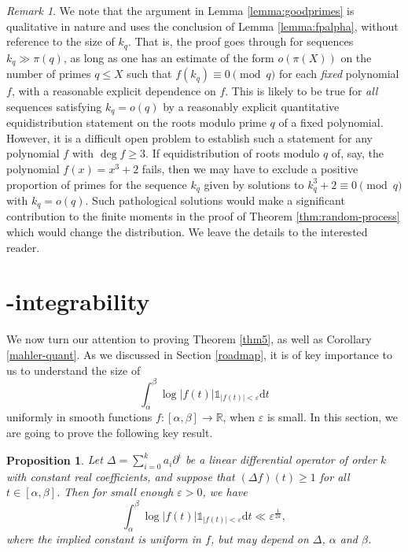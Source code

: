 \documentclass[12pt, a4paper]{amsart}
\newtheorem{proposition}{Proposition}
\theoremstyle{remark}
\newtheorem*{remark}{Remark}
\newcommand{\ud}{\mathrm{d}}
\begin{document}
\begin{remark}
     We note that the argument in Lemma \ref{lemma:goodprimes} is  qualitative in nature and uses the conclusion of Lemma \ref{lemma:fpalpha}, without reference to the size of $k_q$. That is, the proof goes through for sequences $k_q\gg \pi(q)$, as long as one has an estimate of the form $o(\pi(X))$ on the number of primes $q\leq X$ such that $f(k_q)\equiv 0\pmod q$ for each \emph{fixed} polynomial $f$, with a reasonable explicit dependence on $f$. This is likely to be true for \emph{all} sequences satisfying $k_q = o(q)$ by a reasonably explicit quantitative equidistribution statement on the roots modulo prime $q$ of a fixed polynomial. However, it is a difficult open problem to establish such a statement for any polynomial $f$ with $\deg f\ge 3.$
    If equidistribution of roots modulo $q$ of, say, the polynomial  $f(x)=x^3+2$ fails, then we may have to exclude a positive proportion of primes for the sequence $k_q$ given by solutions to $k_q^3+2\equiv 0\pmod q$ with $k_q = o(q).$ Such pathological solutions would make a significant contribution to the finite moments in the proof of Theorem \ref{thm:random-process} which would change the distribution. We leave the details to the interested reader.   
\end{remark}

\section{-integrability}

We now turn our attention to proving Theorem \ref{thm5}, as well as Corollary \ref{mahler-quant}. As we discussed in Section \ref{roadmap}, it is of key importance to us to understand the size of $$\int_{\alpha}^{\beta} \log\lvert f(t)\rvert\mathds1_{\lvert f(t)\rvert<\varepsilon}\ud t$$ uniformly in smooth functions $f:[\alpha, \beta]\to\mathbb R$, when $\varepsilon$ is small. 
In this section, we are going to prove the following key result.

\begin{proposition}\label{logThm}
    Let $\Delta = \sum_{i=0}^k a_i \partial^i$ be a linear differential operator of order $k$ with constant real coefficients, and suppose that $(\Delta f)(t)\geq 1$ for all $t\in[\alpha, \beta]$. Then for small enough $\varepsilon>0$, we have
    \begin{equation}\nonumber
        \int_{\alpha}^{\beta} \log\lvert f(t)\rvert \mathds1_{\lvert f(t)\rvert<\varepsilon}\ud t \ll \varepsilon^{\frac{1}{2k}},
    \end{equation}
    where the implied constant is uniform in $f$, but may depend on $\Delta$, $\alpha$ and $\beta$. 
\end{proposition}
\end{document}
